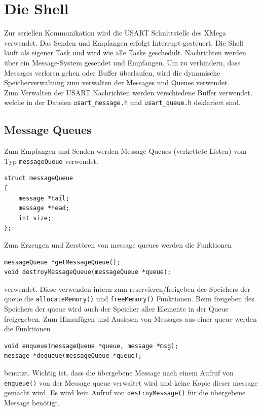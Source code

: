 \documentclass[fontsize=12pt, toc=bibliography, notitlepage]{scrreprt}
\begin{document}
\chapter{Die Shell}
\label{chap:die-shell}
Zur seriellen Kommunikation wird die USART Schnittstelle des XMega verwendet. Das Senden und Empfangen erfolgt Interrupt-gesteuert. Die Shell läuft als eigener Task und wird wie alle Tasks geschedult. Nachrichten werden über ein Message-System gesendet und Empfangen. Um zu verhindern, dass Messages verloren gehen oder Buffer überlaufen, wird die dynamische Speicherverwaltung zum verwalten der Messages und Queues verwendet. \\

Zum Verwalten der USART Nachrichten werden verschiedene Buffer verwendet, welche in der Dateien \lstinline$usart_message.h$ und \lstinline$usart_queue.h$ deklariert sind.

\section{Message Queues}
\label{subsec:shell-queue}
Zum Empfangen und Senden werden Message Queues (verkettete Listen) vom Typ \lstinline$messageQueue$ verwendet.

\begin{lstlisting}
struct messageQueue
{
	message *tail;
	message *head;
	int size;
};
\end{lstlisting}

Zum Erzeugen und Zerstören von message queues werden die Funktionen

\begin{lstlisting}
messageQueue *getMessageQueue();
void destroyMessageQueue(messageQueue *queue);
\end{lstlisting}

verwendet. Diese verwenden intern zum reservieren/freigeben des Speichers der queue die  \lstinline$allocateMemory()$ und \lstinline$freeMemory()$ Funktionen. Beim freigeben des Speichers der queue wird auch der Speicher aller Elemente in der Queue freigegeben. Zum Hinzufügen und Auslesen von Messages aus einer queue werden die Funktionen

\begin{lstlisting}
void enqueue(messageQueue *queue, message *msg);
message *dequeue(messageQueue *queue);
\end{lstlisting}

benutzt. Wichtig ist, dass die übergebene Message nach einem Aufruf von \lstinline$enqueue()$ von der Message queue verwaltet wird und keine Kopie dieser message gemacht wird. Es wird kein Aufruf von \lstinline$destroyMessage()$ für die übergebene Message benötigt.
\end{document}
